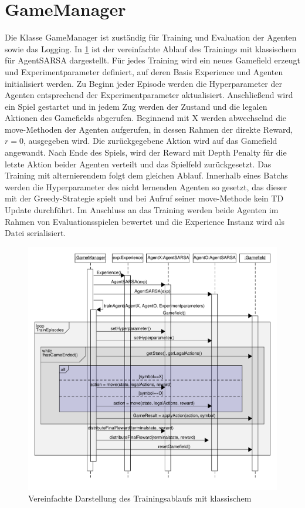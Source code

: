 \section{GameManager}
Die Klasse GameManager ist zuständig für Training und Evaluation der Agenten sowie das Logging.
In \cref{fig:uml_sequence} ist der vereinfachte Ablauf des Trainings mit klassischem \splay für AgentSARSA dargestellt.
Für jedes Training wird ein neues Gamefield erzeugt und Experimentparameter definiert, auf deren Basis Experience und Agenten initialisiert werden. 
Zu Beginn jeder Episode werden die Hyperparameter der Agenten entsprechend der Experimentparameter aktualisiert. 
Anschließend wird ein Spiel gestartet und in jedem Zug werden der Zustand und die legalen Aktionen des Gamefields abgerufen. 
Beginnend mit X werden abwechselnd die move-Methoden der Agenten aufgerufen, in dessen Rahmen der direkte Reward, $r=0$, ausgegeben wird. 
Die zurückgegebene Aktion wird auf das Gamefield angewandt. 
Nach Ende des Spiels, wird der Reward mit Depth Penalty für die letzte Aktion beider Agenten verteilt und das Spielfeld zurückgesetzt. 
Das Training mit alternierendem \splay folgt dem gleichen Ablauf.
Innerhalb eines Batchs werden die Hyperparameter des nicht lernenden Agenten so gesetzt, das dieser mit der Greedy-Strategie spielt und bei Aufruf seiner move-Methode kein \ac{TD} Update durchführt.
Im Anschluss an das Training werden beide Agenten im Rahmen von Evaluationsspielen bewertet und die Experience Instanz wird als Datei serialisiert.

\begin{figure}[h]
    \centering
    \includegraphics[width=\linewidth]{04_Artefakte/01_Abbildungen/uml/uml_sequence.pdf}
    \caption{Vereinfachte Darstellung des Trainingsablaufs mit klassischem \splay}
    \label{fig:uml_sequence}
\end{figure}